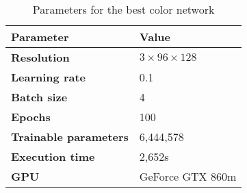 \begin{table}[h!]
	\footnotesize
	\centering
	\begin{tabular}{ll}
	\hline
		\textbf{Parameter} & \textbf{Value}\\
	\hline
	\hline
		\textbf{Resolution} & $3 \times 96\times128$\\
		\textbf{Learning rate} & 0.1\\
		\textbf{Batch size} & 4\\
		\textbf{Epochs} & 100\\
		\textbf{Trainable parameters} & 6,444,578\\
		\textbf{Execution time} & 2,652s\\
		\textbf{GPU} & GeForce GTX 860m\\
	\hline
	\end{tabular}
	\caption{Parameters for the best color network}
	\label{tab:params_best_color_network}
\end{table}
